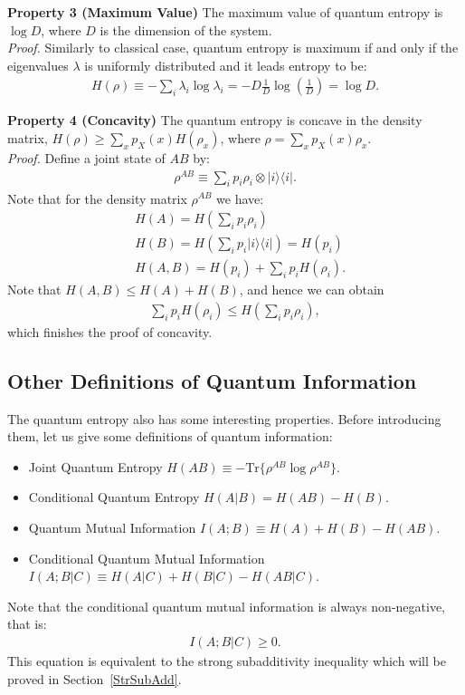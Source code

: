 \textbf{Property 3 (Maximum Value)}
The maximum value of quantum entropy is $\log D$, where $D$ is the dimension of the system. \\
\textit{Proof.} Similarly to classical case, quantum entropy is maximum if and only if the eigenvalues $\lambda$ is uniformly distributed and it leads entropy to be:
\begin{align}
H(\rho) \equiv -\sum_{i} \lambda_i \log \lambda_i = -D\frac{1}{D} \log(\frac{1}{D})=\log D.
\end{align}

\textbf{Property 4 (Concavity)}
The quantum entropy is concave in the density matrix, $H(\rho) \geq \sum_x p_X(x) H(\rho_x)$, where $\rho = \sum_x p_X(x)\rho_x$. \\
\textit{Proof.} Define a joint state of $AB$ by:
\begin{align}
\rho^{AB} \equiv \sum_i p_i \rho_i \otimes |i\rangle \langle i|.
\end{align}
Note that for the density matrix $\rho^{AB}$ we have:
\begin{align}
&H(A)=H(\sum_i p_i \rho_i) \nonumber \\
&H(B)=H(\sum_i p_i |i \rangle \langle i|)=H(p_i) \nonumber \\
&H(A,B)=H(p_i)+\sum_i p_i H(\rho_i).
\end{align}
Note that $H(A,B) \leq H(A)+H(B)$, and hence we can obtain
\begin{align}
\sum_i p_i H(\rho_i) \leq H(\sum_i p_i \rho_i),
\end{align}
which finishes the proof of concavity.

\subsection{Other Definitions of Quantum Information}
The quantum entropy also has some interesting properties.
Before introducing them, let us give some definitions of quantum information: \\
\begin{itemize}
	\item {Joint Quantum Entropy} $H(AB) \equiv -\text{Tr}\{\rho^{AB} \log \rho^{AB}\}$.
	\item {Conditional Quantum Entropy} $H(A|B) = H(AB) - H(B)$.
	\item {Quantum Mutual Information} $I(A;B) \equiv H(A)+H(B)-H(AB)$.
	\item {Conditional Quantum Mutual Information} $I(A;B|C) \equiv H(A|C)+H(B|C)-H(AB|C)$.
\end{itemize}
Note that the conditional quantum mutual information is always non-negative, that is:
\begin{align}
I(A;B|C) \geq 0.
\end{align}
This equation is equivalent to the strong subadditivity inequality which will be proved in Section~\ref{StrSubAdd}.

